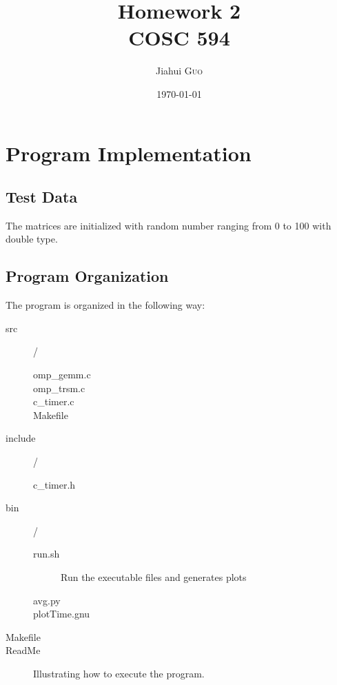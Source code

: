 \documentclass{article}
\title{ Homework 2 \\ COSC 594} %
\author{Jiahui \textsc{Guo}} %
\date{\today} %
\begin{document}
\maketitle %



\section{Program Implementation}

\subsection{Test Data}
The matrices are initialized with random number ranging from 0 to 100 with double type. 

\subsection{Program Organization}
The program is organized in the following way:
\begin{description}
    \item[src]/
        \begin{description}
            \item[omp\_gemm.c]
            \item[omp\_trsm.c]
            \item[c\_timer.c]
            \item[Makefile] 
        \end{description}
    \item[include]/
        \begin{description}
            \item[c\_timer.h]
        \end{description}
    \item[bin]/
        \begin{description}
            \item[run.sh] Run the executable files and generates plots
            \item[avg.py] 
            \item[plotTime.gnu]
        \end{description}
    \item[Makefile]
    \item[ReadMe] Illustrating how to execute the program.
\end{description}
\end{document}
